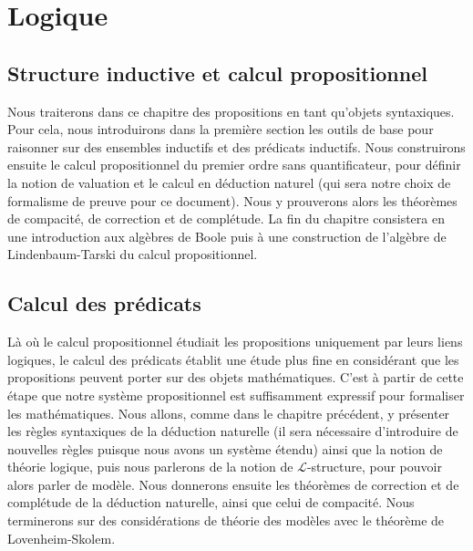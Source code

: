 \setcounter{page}{1}\part{Logique}

\chapter{Structure inductive et calcul propositionnel}

Nous traiterons dans ce chapitre des propositions en tant qu'objets syntaxiques. Pour cela, nous introduirons dans la première section les outils de base pour raisonner sur des ensembles inductifs et des prédicats inductifs. Nous construirons ensuite le calcul propositionnel du premier ordre sans quantificateur, pour définir la notion de valuation et le calcul en déduction naturel (qui sera notre choix de formalisme de preuve pour ce document). Nous y prouverons alors les théorèmes de compacité, de correction et de complétude. La fin du chapitre consistera en une introduction aux algèbres de Boole puis à une construction de l'algèbre de Lindenbaum-Tarski du calcul propositionnel.









\chapter{Calcul des prédicats}

Là où le calcul propositionnel étudiait les propositions uniquement par leurs liens logiques, le calcul des prédicats établit une étude plus fine en considérant que les propositions peuvent porter sur des objets mathématiques. C'est à partir de cette étape que notre système propositionnel est suffisamment expressif pour formaliser les mathématiques. Nous allons, comme dans le chapitre précédent, y présenter les règles syntaxiques de la déduction naturelle (il sera nécessaire d'introduire de nouvelles règles puisque nous avons un système étendu) ainsi que la notion de théorie logique, puis nous parlerons de la notion de $\mathcal L$-structure, pour pouvoir alors parler de modèle. Nous donnerons ensuite les théorèmes de correction et de complétude de la déduction naturelle, ainsi que celui de compacité. Nous terminerons sur des considérations de théorie des modèles avec le théorème de Lovenheim-Skolem.

